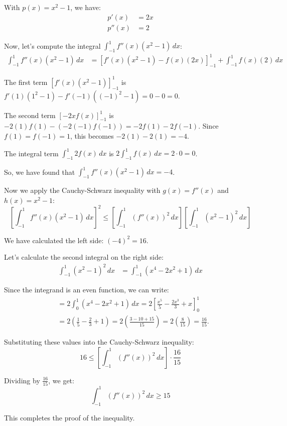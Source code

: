 \documentclass[12pt,a4paper]{article}
\theoremstyle{definition}
\begin{document}
With $p(x) = x^2 - 1$, we have:
\begin{align}
p'(x) &= 2x \\
p''(x) &= 2
\end{align}

Now, let's compute the integral $\int_{-1}^{1} f''(x)(x^2-1) \, dx$:
\begin{align}
\int_{-1}^{1} f''(x)(x^2-1) \, dx &= [f'(x)(x^2-1) - f(x)(2x)]_{-1}^{1} + \int_{-1}^{1} f(x)(2) \, dx
\end{align}

The first term $[f'(x)(x^2-1)]_{-1}^{1}$ is $f'(1)(1^2-1) - f'(-1)((-1)^2-1) = 0 - 0 = 0$.

The second term $[-2xf(x)]_{-1}^{1}$ is $-2(1)f(1) - (-2(-1)f(-1)) = -2f(1) - 2f(-1)$.
Since $f(1) = f(-1) = 1$, this becomes $-2(1) - 2(1) = -4$.

The integral term $\int_{-1}^{1} 2f(x) \, dx$ is $2\int_{-1}^{1} f(x) \, dx = 2 \cdot 0 = 0$.

So, we have found that $\int_{-1}^{1} f''(x)(x^2-1) \, dx = -4$.

Now we apply the Cauchy-Schwarz inequality with $g(x) = f''(x)$ and $h(x) = x^2 - 1$:
\[
\left[\int_{-1}^{1} f''(x)(x^2-1) \, dx\right]^2 \leq \left[\int_{-1}^{1} (f''(x))^2 \, dx\right] \left[\int_{-1}^{1} (x^2-1)^2 \, dx\right]
\]

We have calculated the left side: $(-4)^2 = 16$.

Let's calculate the second integral on the right side:
\begin{align}
\int_{-1}^{1} (x^2-1)^2 \, dx &= \int_{-1}^{1} (x^4 - 2x^2 + 1) \, dx
\end{align}

Since the integrand is an even function, we can write:
\begin{align}
&= 2 \int_{0}^{1} (x^4 - 2x^2 + 1) \, dx = 2 \left[\frac{x^5}{5} - \frac{2x^3}{3} + x\right]_{0}^{1} \\
&= 2 \left(\frac{1}{5} - \frac{2}{3} + 1\right) = 2 \left(\frac{3 - 10 + 15}{15}\right) = 2 \left(\frac{8}{15}\right) = \frac{16}{15}.
\end{align}

Substituting these values into the Cauchy-Schwarz inequality:
\[
16 \leq \left[\int_{-1}^{1} (f''(x))^2 \, dx\right] \cdot \frac{16}{15}
\]

Dividing by $\frac{16}{15}$, we get:
\[
\int_{-1}^{1} (f''(x))^2 \, dx \geq 15
\]

This completes the proof of the inequality.
\end{document}
